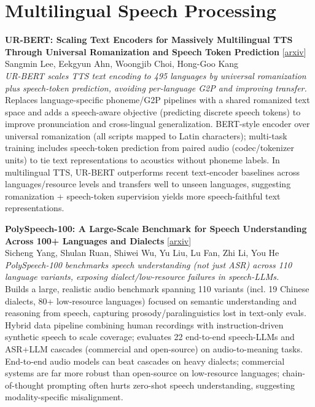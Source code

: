 \documentclass[12pt,letterpaper]{article}
\begin{document}
\medskip


\section*{Multilingual Speech Processing}

{\small\textbf{UR-BERT: Scaling Text Encoders for Massively Multilingual TTS Through Universal Romanization and Speech Token Prediction}} {\scriptsize[\href{https://arxiv.org/abs/2606.11681}{arxiv}]}\\
{\scriptsize Sangmin Lee, Eekgyun Ahn, Woongjib Choi, Hong-Goo Kang}\\

{\small\textit{UR-BERT scales TTS text encoding to 495 languages by universal romanization plus speech-token prediction, avoiding per-language G2P and improving transfer.}}\\[1pt]
{\footnotesize Replaces language-specific phoneme/G2P pipelines with a shared romanized text space and adds a speech-aware objective (predicting discrete speech tokens) to improve pronunciation and cross-lingual generalization. BERT-style encoder over universal romanization (all scripts mapped to Latin characters); multi-task training includes speech-token prediction from paired audio (codec/tokenizer units) to tie text representations to acoustics without phoneme labels. In multilingual TTS, UR-BERT outperforms recent text-encoder baselines across languages/resource levels and transfers well to unseen languages, suggesting romanization + speech-token supervision yields more speech-faithful text representations.}

\medskip

{\small\textbf{PolySpeech-100: A Large-Scale Benchmark for Speech Understanding Across 100+ Languages and Dialects}} {\scriptsize[\href{https://arxiv.org/abs/2606.01016}{arxiv}]}\\
{\scriptsize Sicheng Yang, Shulan Ruan, Shiwei Wu, Yu Liu, Lu Fan, Zhi Li, You He}\\

{\small\textit{PolySpeech-100 benchmarks speech understanding (not just ASR) across 110 language variants, exposing dialect/low-resource failures in speech-LLMs.}}\\[1pt]
{\footnotesize Builds a large, realistic audio benchmark spanning 110 variants (incl. 19 Chinese dialects, 80+ low-resource languages) focused on semantic understanding and reasoning from speech, capturing prosody/paralinguistics lost in text-only evals. Hybrid data pipeline combining human recordings with instruction-driven synthetic speech to scale coverage; evaluates 22 end-to-end speech-LLMs and ASR+LLM cascades (commercial and open-source) on audio-to-meaning tasks. End-to-end audio models can beat cascades on heavy dialects; commercial systems are far more robust than open-source on low-resource languages; chain-of-thought prompting often hurts zero-shot speech understanding, suggesting modality-specific misalignment.}
\end{document}
